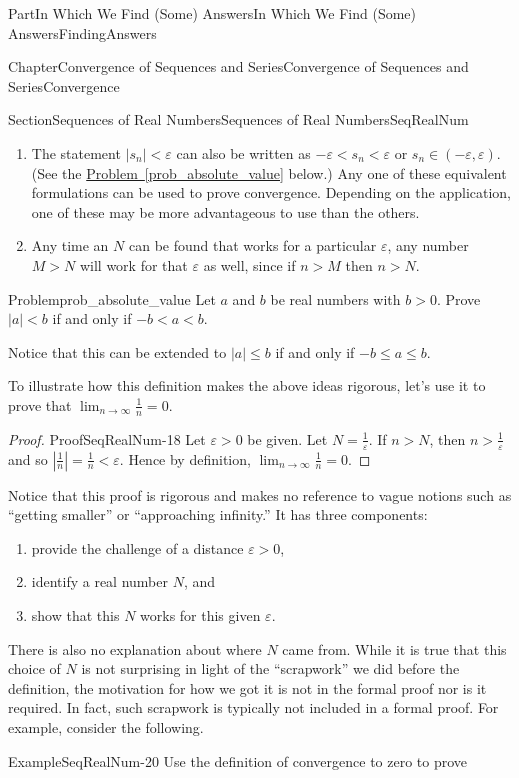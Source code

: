 \documentclass[oneside,10pt,]{book}
\newcommand{\xreffont}{\relax}
\numberwithin{equation}{part}
\newcommand{\abs}[1]{\left|#1\right|}
\def\limit#1#2#3{{\displaystyle\lim_{#1\rightarrow #2}#3}}
\def\limitt#1#2#3{{\displaystyle\lim_{#1\rightarrow #2}\textstyle #3}}
\newcommand{\eps}{\varepsilon}
\newcommand{\lt}{<}
\begin{document}
\begin{partptx}{Part}{In Which We Find (Some) Answers}{}{In Which We Find (Some) Answers}{}{}{FindingAnswers}
\begin{chapterptx}{Chapter}{Convergence of Sequences and Series}{}{Convergence of Sequences and Series}{}{}{Convergence}
\begin{sectionptx}{Section}{Sequences of Real Numbers}{}{Sequences of Real Numbers}{}{}{SeqRealNum}
\begin{enumerate}
\item{}The statement \(|s_n|\lt \eps\) can also be written as \(-\eps\lt s_n\lt \eps\) or \(s_n\in\left(-\eps,\eps\right)\). (See the \hyperref[prob_absolute_value]{Problem~{\xreffont\ref{prob_absolute_value}}} below.) Any one of these equivalent formulations can be used to prove convergence. Depending on the application, one of these may be more advantageous to use than the others.%
\item{}Any time an \(N\) can be found that works for a particular \(\eps\), any number \(M>N\) will work for that \(\eps\) as well, since if \(n>M\) then \(n>N\).%
\end{enumerate}
%
\begin{problem}{Problem}{}{prob_absolute_value}%
 Let \(a\) and \(b\) be real numbers with \(b>0\). Prove \(|a|\lt b\) if and only if \(-b\lt a\lt b\).%
\par
Notice that this can be extended to \(\abs{a}\leq b\) if and only if \(-b\leq a\leq b\).%
\end{problem}
To illustrate how this definition makes the above ideas rigorous, let's use it to prove that \(\limit{n}{\infty}{\textstyle\frac{1}{n}}=0\).%
\begin{proof}{Proof}{}{SeqRealNum-18}
Let \(\eps>0\) be given. Let \(N=\frac{1}{\eps}\). If \(n>N\), then \(n>\frac{1}{\eps}\) and so \(\abs{\frac{1}{n}}=\frac{1}{n}\lt \eps\). Hence by definition, \(\limitt{n}{\infty}{\frac{1}{n}}=0\).%
\end{proof}
Notice that this proof is rigorous and makes no reference to vague notions such as ``getting smaller'' or ``approaching infinity.'' It has three components:%
\begin{enumerate}
\item{}provide the challenge of a distance \(\eps>0\),%
\item{}identify a real number \(N\), and%
\item{}show that this \(N\) works for this given \(\eps\).%
\end{enumerate}
There is also no explanation about where \(N\) came from. While it is true that this choice of \(N\) is not surprising in light of the ``scrapwork'' we did before the definition, the motivation for how we got it is not in the formal proof nor is it required.  In fact, such scrapwork is typically not included in a formal proof.  For example, consider the following.%
\begin{example}{Example}{}{SeqRealNum-20}%
Use the definition of convergence to zero to prove%

\end{example}
\end{sectionptx}
\end{chapterptx}
\end{partptx}
\end{document}
